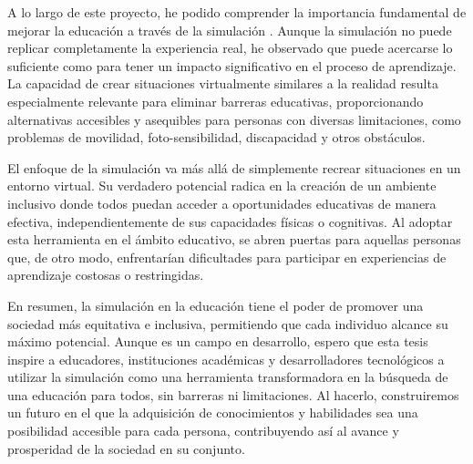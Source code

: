 A lo largo de este proyecto, he podido comprender la importancia fundamental de mejorar la educación a través de la simulación \cite{Simulacion}. Aunque la simulación no puede replicar completamente la experiencia real, he observado que puede acercarse lo suficiente como para tener un impacto significativo en el proceso de aprendizaje. La capacidad de crear situaciones virtualmente similares a la realidad resulta especialmente relevante para eliminar barreras educativas, proporcionando alternativas accesibles y asequibles para personas con diversas limitaciones, como problemas de movilidad, foto-sensibilidad, discapacidad y otros obstáculos.

El enfoque de la simulación va más allá de simplemente recrear situaciones en un entorno virtual. Su verdadero potencial radica en la creación de un ambiente inclusivo donde todos puedan acceder a oportunidades educativas de manera efectiva, independientemente de sus capacidades físicas o cognitivas. Al adoptar esta herramienta en el ámbito educativo, se abren puertas para aquellas personas que, de otro modo, enfrentarían dificultades para participar en experiencias de aprendizaje costosas o restringidas.

En resumen, la simulación en la educación tiene el poder de promover una sociedad más equitativa e inclusiva, permitiendo que cada individuo alcance su máximo potencial. Aunque es un campo en desarrollo, espero que esta tesis inspire a educadores, instituciones académicas y desarrolladores tecnológicos a utilizar la simulación como una herramienta transformadora en la búsqueda de una educación para todos, sin barreras ni limitaciones. Al hacerlo, construiremos un futuro en el que la adquisición de conocimientos y habilidades sea una posibilidad accesible para cada persona, contribuyendo así al avance y prosperidad de la sociedad en su conjunto.
